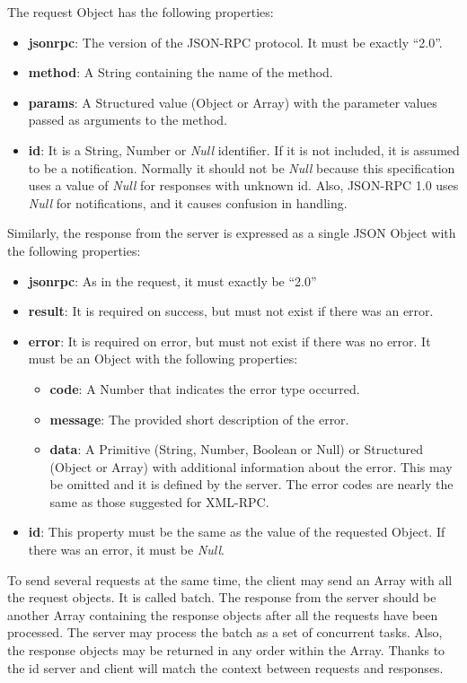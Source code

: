 \documentclass[a4paper, 12pt]{article} %
\begin{document}
            The request Object has the following properties:
            \begin{itemize}
                \item \textbf{jsonrpc}: The version of the JSON-RPC protocol. It must be exactly “2.0”.
                \item \textbf{method}: A String containing the name of the method.
                \item \textbf{params}: A Structured value (Object or Array) with the parameter values passed as arguments to the method.
                \item \textbf{id}: It is a String, Number or \textit{Null} identifier. If it is not included, it is assumed to be a notification. Normally it should not be \textit{Null} because this specification uses a value of \textit{Null} for responses with unknown id. Also, JSON-RPC 1.0 uses \textit{Null} for notifications, and it causes confusion in handling.
            \end{itemize}
            Similarly, the response from the server is expressed as a single JSON Object with the following properties:
            \begin{itemize}
                \item \textbf{jsonrpc}: As in the request, it must exactly be “2.0”
                \item \textbf{result}: It is required on success, but must not exist if there was an error.
                \item \textbf{error}: It is required on error, but must not exist if there was no error. It must be an Object with the following properties:
                \begin{itemize}
                    \item \textbf{code}: A Number that indicates the error type occurred.
                    \item \textbf{message}: The provided short description of the error.
                    \item \textbf{data}: A Primitive (String, Number, Boolean or Null) or Structured (Object or Array) with additional information about the error. This may be omitted and it is defined by the server. The error codes are nearly the same as those suggested for XML-RPC\cite{rpc-err}.
                \end{itemize}
                \item \textbf{id}: This property must be the same as the value of the requested Object. If there was an error, it must be \textit{Null}.
            \end{itemize}
            To send several requests at the same time, the client may send an Array with all the request objects. It is called batch. The response from the server should be another Array containing the response objects after all the requests have been processed. The server may process the batch as a set of concurrent tasks. Also, the response objects may be returned in any order within the Array. Thanks to the id server and client will match the context between requests and responses.
            
\end{document}
